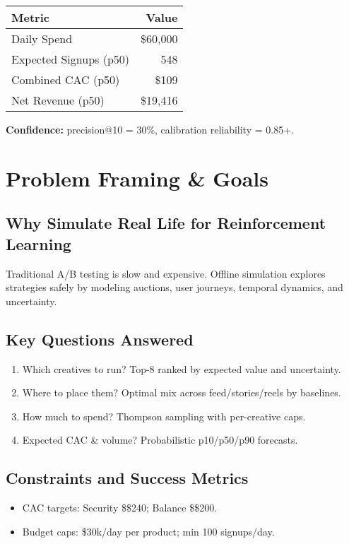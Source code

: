 \documentclass[11pt,a4paper]{report}
\begin{document}
\begin{metricbox}
\begin{center}
\begin{tabular}{lr}
\toprule
\textbf{Metric} & \textbf{Value} \\
\midrule
Daily Spend & \$60,000 \\
Expected Signups (p50) & 548 \\
Combined CAC (p50) & \$109 \\
Net Revenue (p50) & \$19,416 \\
\bottomrule
\end{tabular}
\end{center}
\vspace{0.5em}
\textbf{Confidence:} precision@10 = 30\%, calibration reliability = 0.85+.
\end{metricbox}

\chapter{Problem Framing \& Goals}
\section{Why Simulate Real Life for Reinforcement Learning}
Traditional A/B testing is slow and expensive. Offline simulation explores strategies safely by modeling auctions, user journeys, temporal dynamics, and uncertainty.

\section{Key Questions Answered}
\begin{enumerate}
  \item Which creatives to run? Top-8 ranked by expected value and uncertainty.
  \item Where to place them? Optimal mix across feed/stories/reels by baselines.
  \item How much to spend? Thompson sampling with per-creative caps.
  \item Expected CAC \& volume? Probabilistic p10/p50/p90 forecasts.
\end{enumerate}

\section{Constraints and Success Metrics}
\begin{metricbox}
\begin{itemize}
  \item CAC targets: Security \$\leq\$240; Balance \$\leq\$200.
  \item Budget caps: \$30k/day per product; min 100 signups/day.
\end{itemize}
\end{metricbox}
\end{document}
